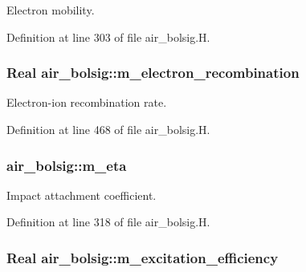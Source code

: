 Electron mobility. 



Definition at line 303 of file air\+\_\+bolsig.\+H.

\subsubsection[{\texorpdfstring{m\+\_\+electron\+\_\+recombination}{m_electron_recombination}}]{\setlength{\rightskip}{0pt plus 5cm}Real air\+\_\+bolsig\+::m\+\_\+electron\+\_\+recombination\hspace{0.3cm}{\ttfamily [protected]}}\hypertarget{classair__bolsig_a5b0fc458ce803263f9ca25c19a68c5be}{}\label{classair__bolsig_a5b0fc458ce803263f9ca25c19a68c5be}


Electron-\/ion recombination rate. 



Definition at line 468 of file air\+\_\+bolsig.\+H.

\subsubsection[{\texorpdfstring{m\+\_\+eta}{m_eta}}]{ air\+\_\+bolsig\+::m\+\_\+eta\hspace{0.3cm}{\ttfamily [protected]}}\hypertarget{classair__bolsig_a237f6d1b4a6c325d04516e9bd4e13b70}{}\label{classair__bolsig_a237f6d1b4a6c325d04516e9bd4e13b70}


Impact attachment coefficient. 



Definition at line 318 of file air\+\_\+bolsig.\+H.

\subsubsection[{\texorpdfstring{m\+\_\+excitation\+\_\+efficiency}{m_excitation_efficiency}}]{\setlength{\rightskip}{0pt plus 5cm}Real air\+\_\+bolsig\+::m\+\_\+excitation\+\_\+efficiency\hspace{0.3cm}{\ttfamily [protected]}}\hypertarget{classair__bolsig_ad2417ddb9e4d2f2f9963e69b02dad2a2}{}\label{classair__bolsig_ad2417ddb9e4d2f2f9963e69b02dad2a2}


